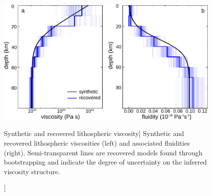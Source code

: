 \begin{figure}
\includegraphics{ch2/figures/Fig4.pdf}
\caption
[Synthetic and recovered lithospheric viscosity]
{Synthetic and recovered lithospheric viscosities (left) and
associated fluidities (right).  Semi-transparent lines are recovered
models found through bootstrapping and indicate the degree of
uncertainty on the inferred viscosity structure.}
\label{ch2:fig:4}
\end{figure}

